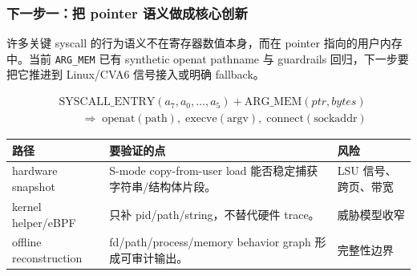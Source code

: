 \documentclass[aspectratio=169,10pt]{beamer}
\begin{document}
\begin{frame}
  \frametitle{下一步一：把 pointer 语义做成核心创新}
  \vskip0.1cm

  许多关键 syscall 的行为语义不在寄存器数值本身，而在 pointer 指向的用户内存中。当前 \texttt{ARG\_MEM} 已有 synthetic openat pathname 与 guardrails 回归，下一步要把它推进到 Linux/CVA6 信号接入或明确 fallback。

  \vskip0.1cm
  {\small
  \[
  \begin{aligned}
    &\mathrm{SYSCALL\_ENTRY}(a_7, a_0,\ldots,a_5)
      + \mathrm{ARG\_MEM}(ptr, bytes)\\
    &\qquad\Rightarrow\;
      \mathrm{openat}(\mathrm{path}),\;
      \mathrm{execve}(\mathrm{argv}),\;
      \mathrm{connect}(\mathrm{sockaddr})
  \end{aligned}
  \]}
  \vskip0.05cm

  \begin{center}\scriptsize
  \begin{tabularx}{0.92\linewidth}{@{}L{2.5cm}Y L{2.4cm}@{}}
    \toprule
    \textbf{路径} & \textbf{要验证的点} & \textbf{风险} \\
    \midrule
    hardware snapshot & S-mode copy-from-user load 能否稳定捕获字符串/结构体片段。 & LSU 信号、跨页、带宽 \\
    kernel helper/eBPF & 只补 pid/path/string，不替代硬件 trace。 & 威胁模型收窄 \\
    offline reconstruction & fd/path/process/memory behavior graph 形成可审计输出。 & 完整性边界 \\
    \bottomrule
  \end{tabularx}
  \end{center}
\end{frame}
\end{document}
